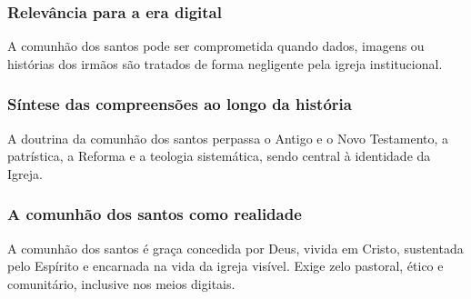 \subsubsection{Relevância para a era digital}
A comunhão dos santos pode ser comprometida quando dados, imagens ou histórias dos irmãos são tratados de forma negligente pela igreja institucional.

\subsubsection{Síntese das compreensões ao longo da história}
A doutrina da comunhão dos santos perpassa o Antigo e o Novo Testamento, a patrística, a Reforma e a teologia sistemática, sendo central à identidade da Igreja.

\subsubsection{A comunhão dos santos como realidade}
A comunhão dos santos é graça concedida por Deus, vivida em Cristo, sustentada pelo Espírito e encarnada na vida da igreja visível. Exige zelo pastoral, ético e comunitário, inclusive nos meios digitais.
